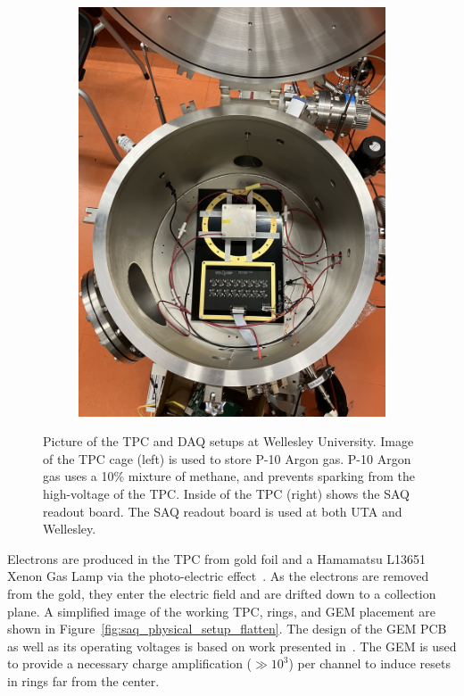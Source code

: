 \begin{figure}[]
\begin{subfigure}{.5\textwidth}
  \includegraphics[width=\textwidth]{images/saq_wellesley_tpc_daq.jpg}
  \caption{}
\end{subfigure}
\caption{Picture of the TPC and DAQ setups at Wellesley University.
Image of the TPC cage (left) is used to store P-10 Argon gas. P-10 Argon gas uses a 10\% mixture of methane, and prevents sparking from the high-voltage of the TPC.
Inside of the TPC (right) shows the SAQ readout board.
The SAQ readout board is used at both UTA and Wellesley.
}
\label{fig:wellesley_tpc}
\end{figure}

Electrons are produced in the TPC from gold foil and a Hamamatsu L13651~\citep{hamamatsu_tls1023e} Xenon Gas Lamp via the photo-electric effect~\citep{https://doi.org/10.1002/andp.19053220607}.
As the electrons are removed from the gold, they enter the electric field and are drifted down to a collection plane.
A simplified image of the working TPC, rings, and GEM placement are shown in Figure~\ref{fig:saq_physical_setup_flatten}.
The design of the GEM PCB as well as its operating voltages is based on work presented in~\citep{THORPE2023167438}.
The GEM is used to provide a necessary charge amplification ($\gg 10^{3}$) per channel to induce resets in rings far from the center.

